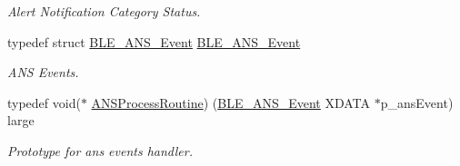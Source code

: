 \begin{DoxyCompactItemize}
\begin{DoxyCompactList}\small\item\em Alert Notification Category Status. \end{DoxyCompactList}\item 
typedef struct \hyperlink{struct_b_l_e___a_n_s___event}{B\+L\+E\+\_\+\+A\+N\+S\+\_\+\+Event} \hyperlink{group___b_l_e___a_n_s_ga4af394d9f47c830af202c97a789e567c}{B\+L\+E\+\_\+\+A\+N\+S\+\_\+\+Event}\hypertarget{group___b_l_e___a_n_s_ga4af394d9f47c830af202c97a789e567c}{}\label{group___b_l_e___a_n_s_ga4af394d9f47c830af202c97a789e567c}

\begin{DoxyCompactList}\small\item\em A\+NS Events. \end{DoxyCompactList}\item 
typedef void($\ast$ \hyperlink{group___b_l_e___a_n_s_ga1e3c95d8f99910c134671407f9f3cd2a}{A\+N\+S\+Process\+Routine}) (\hyperlink{struct_b_l_e___a_n_s___event}{B\+L\+E\+\_\+\+A\+N\+S\+\_\+\+Event} X\+D\+A\+TA $\ast$p\+\_\+ans\+Event) large\hypertarget{group___b_l_e___a_n_s_ga1e3c95d8f99910c134671407f9f3cd2a}{}\label{group___b_l_e___a_n_s_ga1e3c95d8f99910c134671407f9f3cd2a}

\begin{DoxyCompactList}\small\item\em Prototype for ans events handler. \end{DoxyCompactList}\end{DoxyCompactItemize}
